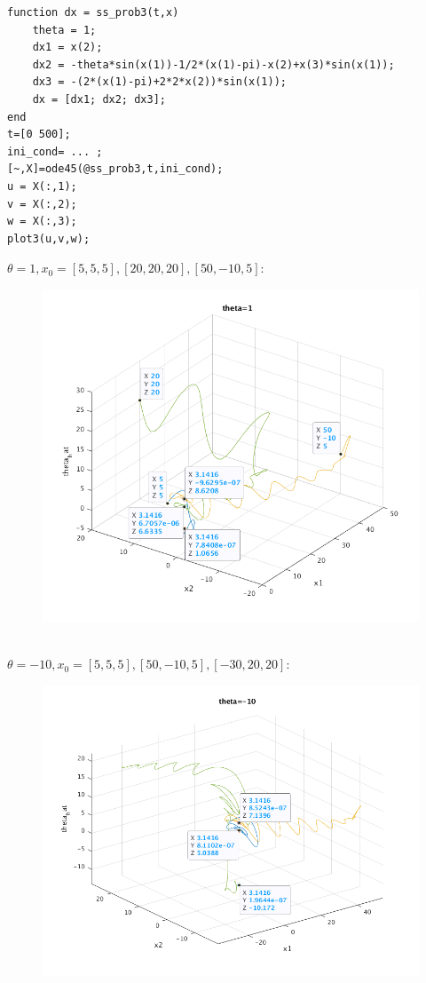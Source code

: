 \documentclass[12pt,letter]{article}
\begin{document}
\begin{itemize}
  \pagebreak

\begin{verbatim}
function dx = ss_prob3(t,x)
    theta = 1;
    dx1 = x(2);
    dx2 = -theta*sin(x(1))-1/2*(x(1)-pi)-x(2)+x(3)*sin(x(1));
    dx3 = -(2*(x(1)-pi)+2*2*x(2))*sin(x(1));
    dx = [dx1; dx2; dx3];
end
t=[0 500];
ini_cond= ... ;
[~,X]=ode45(@ss_prob3,t,ini_cond);
u = X(:,1);
v = X(:,2);
w = X(:,3);
plot3(u,v,w);
\end{verbatim}
  $\theta=1, x_0=[5,5,5], [20,20,20], [50,-10,5]:$\\
  \begin{figure}[h]
    \includegraphics[width=15cm,keepaspectratio]{matlab/3_10/q3_10_theta_1.png}
  \end{figure}\\

  \pagebreak
  $\theta=-10, x_0=[5,5,5], [50,-10,5], [-30,20,20]:$\\
  \begin{figure}[h]
    \includegraphics[width=16cm,keepaspectratio]{matlab/3_10/q3_10_theta_minus_10.png}
  \end{figure}
  

\end{itemize}
\end{document}
